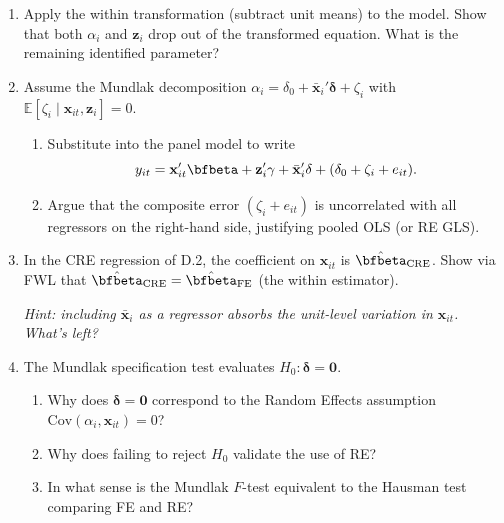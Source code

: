 \documentclass{article}
\newcommand{\E}{\mathbb{E}}
\begin{document}
\begin{enumerate}[label=\textbf{D.\arabic*},leftmargin=*,itemsep=10pt]

\item  Apply the within transformation (subtract unit means) to the model.  Show that both $\alpha_i$ and $\bm z_i$ drop out of the transformed equation.  What is the remaining identified parameter?

\item  Assume the Mundlak decomposition $\alpha_i = \delta_0 + \bar{\bm x}_i'\bm\delta + \zeta_i$ with $\E[\zeta_i \mid \bm x_{it}, \bm z_i] = 0$.
\begin{enumerate}[label=(\alph*)]
  \item Substitute into the panel model to write
  $$y_{it} = \bm x_{it}'\bfbeta + \bm z_i'\bm\gamma + \bar{\bm x}_i'\bm\delta + (\delta_0 + \zeta_i + e_{it}).$$
  \item Argue that the composite error $(\zeta_i + e_{it})$ is uncorrelated with all regressors on the right-hand side, justifying pooled OLS (or RE GLS).
\end{enumerate}

\item  In the CRE regression of D.2, the coefficient on $\bm x_{it}$ is $\hat\bfbeta_{\text{CRE}}$.  Show via FWL that $\hat\bfbeta_{\text{CRE}} = \hat\bfbeta_{\text{FE}}$ (the within estimator).

\emph{Hint: including $\bar{\bm x}_i$ as a regressor absorbs the unit-level variation in $\bm x_{it}$.  What's left?}

\item  The Mundlak specification test evaluates $H_0: \bm\delta = \bm 0$.
\begin{enumerate}[label=(\alph*)]
  \item Why does $\bm\delta = \bm 0$ correspond to the Random Effects assumption $\text{Cov}(\alpha_i, \bm x_{it}) = 0$?
  \item Why does failing to reject $H_0$ validate the use of RE?
  \item In what sense is the Mundlak $F$-test equivalent to the Hausman test comparing FE and RE?
\end{enumerate}


\end{enumerate}
\end{document}
